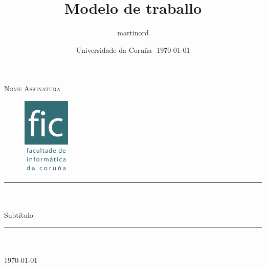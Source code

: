 \documentclass[12pt]{article}
\begin{document}
\title{Modelo de traballo}

\def \subtitle {Subtítulo}

\author{martinord}

\date{Universidade da Coruña- \today}


\begin{titlepage}

\newcommand{\HRule}{\rule{\linewidth}{0.5mm}} %

\center %
 

\textsc{\Large Nome Asignatura}\\[1cm]

\begin{figure}[!h]
	\centering
	\includegraphics[width=0.2\textwidth]{logo.png}
\end{figure}


\HRule \\[0.4cm]
{ \huge \bfseries \@title}\\[0.5cm]
{ \Large \subtitle}\\[0.3cm]
\HRule \\[1.5cm]
 

	\@author \\[3cm]


{\large \today}\\[2cm] 
 

\vfill %

\end{titlepage}

\tableofcontents
\clearpage



\clearpage


 
\end{document}
